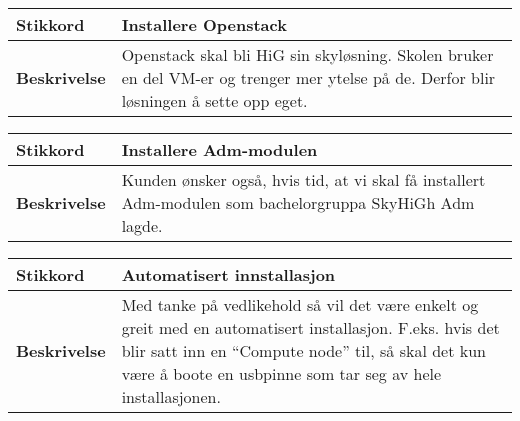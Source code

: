 \begin{table}[H]
	\begin{tabular}[Figur 2]{| p{2cm} p{9cm} |}
		\hline \textbf{Stikkord} & Installere Openstack \\
		\hline \textbf{Beskrivelse} & Openstack skal bli HiG sin skyløsning. Skolen bruker en del VM-er og trenger mer ytelse på de. Derfor blir løsningen å sette opp eget. \\
	\end{tabular}
\end{table}

\begin{table}[H]
	\begin{tabular}[Figur 2]{| p{2cm} p{9cm} |}
		\hline \textbf{Stikkord} & Installere Adm-modulen \\
		\hline \textbf{Beskrivelse} & Kunden ønsker også, hvis tid, at vi skal få installert Adm-modulen som bachelorgruppa SkyHiGh Adm lagde. 
	\end{tabular}
\end{table}

\begin{table}[H]
	\begin{tabular}[Figur 2]{| p{2cm} p{9cm} |}
		\hline \textbf{Stikkord} & Automatisert innstallasjon \\
		\hline \textbf{Beskrivelse} & Med tanke på vedlikehold så vil det være enkelt og greit med en automatisert installasjon. F.eks. hvis det blir satt inn en “Compute node” til, så skal det kun være å boote en usbpinne som tar seg av hele installasjonen.  \\
	\end{tabular}
\end{table}
